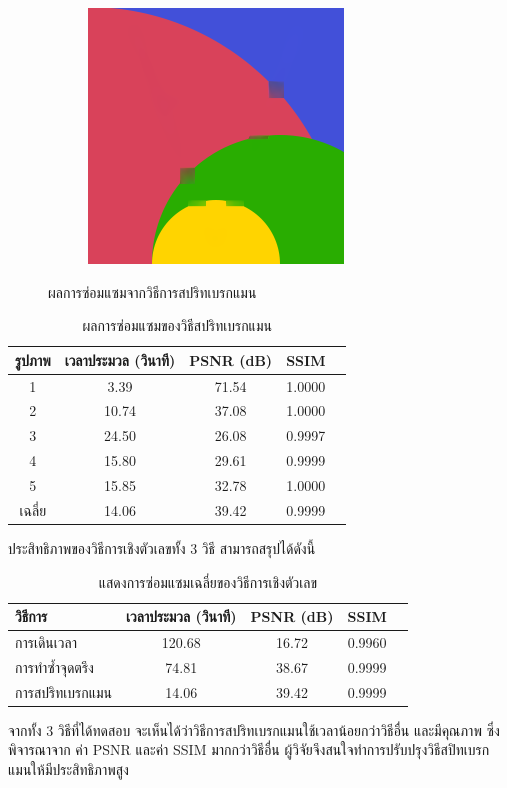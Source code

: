 \documentclass[hidelinks, a4paper,12pt]{article}
\numberwithin{equation}{section}							%
\numberwithin{equation}{section}
\begin{document}
{\begin{figure}[H]
\begin{subfigure}{0.4\linewidth}
		\includegraphics[width=0.8\linewidth]{images/result_ex1/splitbergman05.png}			
	\end{subfigure}
	\caption{ผลการซ่อมแซมจากวิธีการสปริทเบรกแมน}
		\label{result:image-splitbregman}
\end{figure}
\begin{table}[H]
	\centering
	\begin{tabular}[ht]{|c|c|c|c|c|}
		\hline
		รูปภาพ &เวลาประมวล  (วินาที) & PSNR (dB) & SSIM \\
		\hline
		1 & 3.39 & 71.54 & 1.0000 \\ 
		2 & 10.74 & 37.08 & 1.0000 \\
		3 &  24.50 & 26.08 & 0.9997 \\
		4 & 15.80  & 29.61  & 0.9999 \\
		5 & 15.85  & 32.78  & 1.0000 \\
		\hline
		เฉลี่ย & 14.06  & 39.42  & 0.9999 \\
		\hline
	\end{tabular}
	\caption{ผลการซ่อมแซมของวิธีสปริทเบรกแมน}
	\label{result:table-splitbregman}
\end{table}
	\hspace{1cm} ประสิทธิภาพของวิธีการเชิงตัวเลขทั้ง 3 วิธี สามารถสรุปได้ดังนี้
	\begin{table}[H]
		\centering
		\begin{tabular}[ht]{|l|c|c|c|c|}
			\hline
			วิธีการ  & เวลาประมวล  (วินาที) & PSNR (dB) & SSIM \\
			\hline
			การเดินเวลา & 120.68 & 16.72 & 0.9960 \\
			การทำซ้ำจุดตรึง & 74.81 & 38.67 & 0.9999 \\
			การสปริทเบรกแมน & 14.06 & 39.42 & 0.9999  \\
			\hline
		\end{tabular}
		\caption{แสดงการซ่อมแซมเฉลี่ยของวิธีการเชิงตัวเลข}
	\end{table}	
	\hspace{1cm} 
	จากทั้ง 3 วิธีที่ได้ทดสอบ จะเห็นได้ว่าวิธีการสปริทเบรกแมนใช้เวลาน้อยกว่าวิธีอื่น และมีคุณภาพ ซึ่งพิจารณาจาก ค่า PSNR และค่า SSIM มากกว่าวิธีอื่น ผู้วิจัยจึงสนใจทำการปรับปรุงวิธีสปิทเบรกแมนให้มีประสิทธิภาพสูง
	
}
\end{document}
